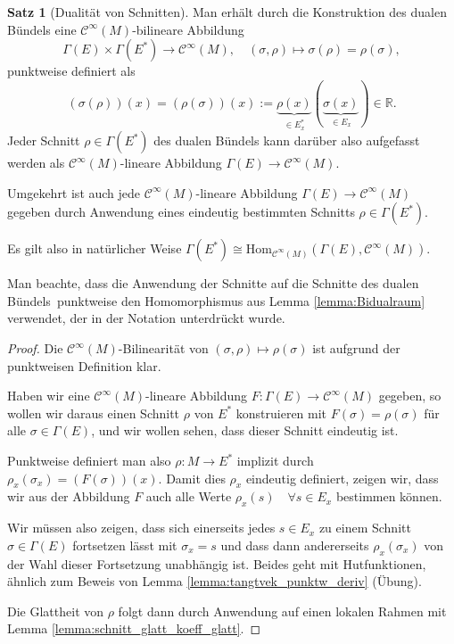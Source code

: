 \documentclass[a4paper]{scrbook}
\numberwithin{equation}{chapter}
\newcommand{\R}{\mathbb{R}}
\newcommand{\sC}{\mathcal{C}^{\infty}}
\theoremstyle{definition}
\newtheorem{satz}[defn]{Satz}
\begin{document}
		\begin{satz}[Dualität von Schnitten]\label{satz:Dualität}
			Man erhält durch die Konstruktion des dualen Bündels eine $\sC(M)$-bilineare Abbildung
			\[\Gamma(E)\times\Gamma(E^*)\rightarrow \sC(M),\quad (\sigma,\rho)\mapsto \sigma(\rho)=\rho(\sigma),\]
			punktweise definiert als
			\[(\sigma(\rho))(x)=(\rho(\sigma))(x):=\underbrace{\rho(x)}_{\in E^*_x}(\underbrace{\sigma(x)}_{\in E_x})\in \R.\]
			Jeder Schnitt $\rho \in \Gamma(E^*)$ des dualen Bündels kann darüber also aufgefasst werden als $\sC(M)$-lineare Abbildung $\Gamma(E) \to \sC(M)$.
			
			Umgekehrt ist auch jede $\sC(M)$-lineare Abbildung $\Gamma(E) \to \sC(M)$ gegeben durch Anwendung eines eindeutig bestimmten Schnitts $\rho \in \Gamma(E^*)$.
			
			Es gilt also in natürlicher Weise $\Gamma(E^*)\cong \mathrm{Hom}_{\sC(M)}(\Gamma(E),\sC(M))$. 
			
			Man beachte, dass die \glqq Anwendung der Schnitte auf die Schnitte des dualen Bündels\grqq\ punktweise den Homomorphismus aus Lemma \ref{lemma:Bidualraum} verwendet, der in der Notation unterdrückt wurde.
			
			\begin{proof}
				Die $\sC(M)$-Bilinearität von $(\sigma,\rho) \mapsto \rho(\sigma)$ ist aufgrund der punktweisen Definition klar.
				
				Haben wir eine $\sC(M)$-lineare Abbildung $F\colon \Gamma(E)\to\sC(M)$ gegeben, so wollen wir daraus einen Schnitt $\rho$ von $E^*$ konstruieren mit $F(\sigma) = \rho(\sigma)$ für alle $\sigma \in \Gamma(E)$, und wir wollen sehen, dass dieser Schnitt eindeutig ist.
				
				Punktweise definiert man also $\rho:M\rightarrow E^*$ implizit durch $\rho_x(\sigma_x) = (F(\sigma))(x)$. Damit dies $\rho_x$ eindeutig definiert, zeigen wir, dass wir aus der Abbildung $F$ auch alle Werte $\rho_x(s)\quad \forall s\in E_x$ bestimmen können.
				
				Wir müssen also zeigen, dass sich einerseits jedes $s \in E_x$ zu einem Schnitt $\sigma \in \Gamma(E)$ fortsetzen lässt mit $\sigma_x = s$ und dass dann andererseits $\rho_x(\sigma_x)$ von der Wahl dieser Fortsetzung unabhängig ist. Beides geht mit Hutfunktionen, ähnlich zum Beweis von Lemma \ref{lemma:tangtvek_punktw_deriv} (Übung).
				
				Die Glattheit von $\rho$ folgt dann durch Anwendung auf einen lokalen Rahmen mit Lemma \ref{lemma:schnitt_glatt_koeff_glatt}.
			\end{proof}
		\end{satz}
		
\end{document}
